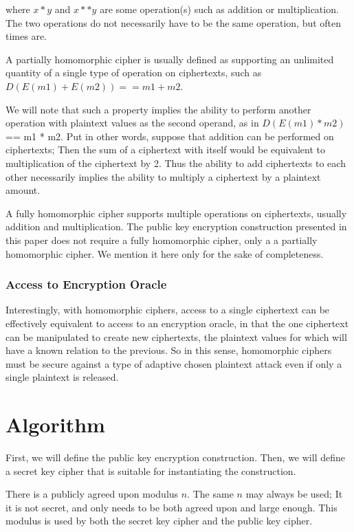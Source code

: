 \documentclass[preprint]{iacrtrans}
\begin{document}
where $x * y$ and $x ** y$ are some operation(s) such as addition or multiplication. The two operations do not necessarily have to be the same operation, but often times are.

A partially homomorphic cipher is usually defined as supporting an unlimited quantity of a single type of operation on ciphertexts, such as $D(E(m1) + E(m2)) == m1 + m2$.

We will note that such a property implies the ability to perform another operation with plaintext values as the second operand, as in $D(E(m1) * m2)$ == m1 * m2. Put in other words, suppose that addition can be performed on ciphertexts; Then the sum of a ciphertext with itself would be equivalent to multiplication of the ciphertext by 2. Thus the ability to add ciphertexts to each other necessarily implies the ability to multiply a ciphertext by a plaintext amount.

A fully homomorphic cipher supports multiple operations on ciphertexts, usually addition and multiplication. The public key encryption construction presented in this paper does not require a fully homomorphic cipher, only a a partially homomorphic cipher. We mention it here only for the sake of completeness.

\subsubsection{Access to Encryption Oracle}
Interestingly, with homomorphic ciphers, access to a single ciphertext can be effectively equivalent to access to an encryption oracle, in that the one ciphertext can be manipulated to create new ciphertexts, the plaintext values for which will have a known relation to the previous. So in this sense, homomorphic ciphers must be secure against a type of adaptive chosen plaintext attack even if only a single plaintext is released.

\section{Algorithm}
First, we will define the public key encryption construction. Then, we will define a secret key cipher that is suitable for instantiating the construction.

There is a publicly agreed upon modulus $n$. The same $n$ may always be used; It it is not secret, and only needs to be both agreed upon and large enough. This modulus is used by both the secret key cipher and the public key cipher.
\end{document}
